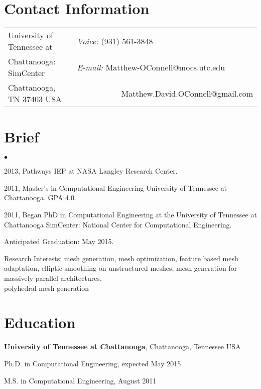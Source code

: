 \documentclass[margin,line]{res}
\newenvironment{list1}{
  \begin{list}{\ding{113}}{%
      \setlength{\itemsep}{0in}
      \setlength{\parsep}{0in} \setlength{\parskip}{0in}
      \setlength{\topsep}{0in} \setlength{\partopsep}{0in} 
      \setlength{\leftmargin}{0.17in}}}{\end{list}}
\newenvironment{list2}{
  \begin{list}{$\bullet$}{%
      \setlength{\itemsep}{0in}
      \setlength{\parsep}{0in} \setlength{\parskip}{0in}
      \setlength{\topsep}{0in} \setlength{\partopsep}{0in} 
      \setlength{\leftmargin}{0.2in}}}{\end{list}}
\begin{document}

\begin{resume}
\section{\sc Contact Information}
\vspace{.05in}
\begin{tabular}{@{}p{2in}p{4in}}
                  
        
University of Tennessee at  & {\it Voice:}  (931) 561-3848 \\        
Chattanooga: SimCenter &  {\it E-mail:}  Matthew-OConnell@mocs.utc.edu\\   
Chattanooga, TN  37403 USA  & \ \ \ \ \ \ \ \ \ \ \ Matthew.David.OConnell@gmail.com\\     
\end{tabular}

\section{\sc Brief}
\begin{list2}
\item 2013, Pathways IEP at NASA Langley Research Center. 
\item 2011, Master's in Computational Engineering University of Tennessee at Chattanooga. GPA 4.0.
\item 2011, Began PhD in Computational Engineering at the University of Tennessee at \\ Chattanooga SimCenter: National Center for Computational Engineering.
\item Anticipated Graduation: May 2015.
\item Research Interests: mesh generation, mesh optimization, feature based mesh adaptation, elliptic smoothing on unstructured meshes, mesh generation for massively parallel architectures, \\ polyhedral mesh generation
\end{list2}



\section{\sc Education}
{\bf University of Tennessee at Chattanooga}, Chattanooga, Tennessee USA\\
\vspace*{-.1in}
\begin{list1}
\item[] Ph.D. in Computational Engineering, expected May 2015
\vspace*{.05in}
\item[] M.S. in Computational Engineering,  August 2011
\end{list1}


\end{resume}
\end{document}
